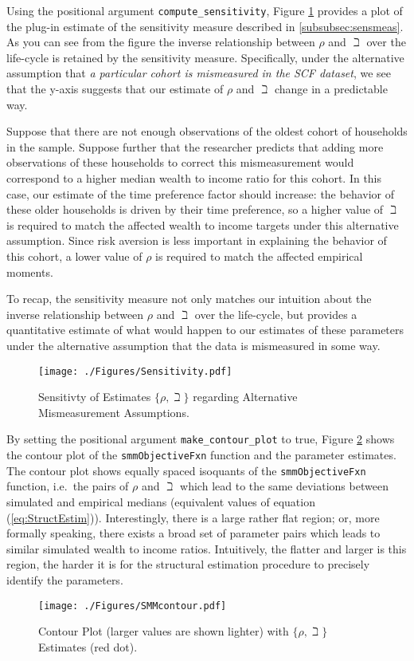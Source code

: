Using the positional argument \texttt{compute\_sensitivity}, Figure \ref{fig:PlotSensitivityMeasure} provides a plot of the plug-in estimate of the sensitivity measure described in \ref{subsubsec:sensmeas}. As you can see from the figure the inverse relationship between $\rho$ and $\beth$ over the life-cycle is retained by the sensitivity measure. Specifically, under the alternative assumption that \textit{a particular cohort is mismeasured in the SCF dataset}, we see that the y-axis suggests that our estimate of $\rho$ and $\beth$ change in a predictable way.

Suppose that there are not enough observations of the oldest cohort of households in the sample. Suppose further that the researcher predicts that adding more observations of these households to correct this mismeasurement would correspond to a higher median wealth to income ratio for this cohort. In this case, our estimate of the time preference factor should increase: the behavior of these older households is driven by their time preference, so a higher value of $\beth$ is required to match the affected wealth to income targets under this alternative assumption. Since risk aversion is less important in explaining the behavior of this cohort, a lower value of $\rho$ is required to match the affected empirical moments.

To recap, the sensitivity measure not only matches our intuition about the inverse relationship between $\rho$ and $\beth$ over the life-cycle, but provides a quantitative estimate of what would happen to our estimates of these parameters under the alternative assumption that the data is mismeasured in some way.

\hypertarget{PlotSensitivityMeasure}{}
\begin{figure}
  \texttt{[image: ./Figures/Sensitivity.pdf]}
  \caption{Sensitivty of Estimates $\{\rho,{\beth}\}$ regarding Alternative Mismeasurement Assumptions.}
  \label{fig:PlotSensitivityMeasure}
\end{figure}

By setting the positional argument \texttt{make\_contour\_plot} to true, Figure \ref{fig:PlotContourMedianStrEst} shows the contour plot of the \texttt{smmObjectiveFxn} function and the parameter estimates. The contour plot shows equally spaced isoquants of the \texttt{smmObjectiveFxn} function, i.e.\ the pairs of $\rho$ and ${\beth}$ which lead to the same deviations between simulated and empirical medians (equivalent values of equation (\ref{eq:StructEstim})). Interestingly, there is a large rather flat region; or, more formally speaking, there exists a broad set of parameter pairs which leads to similar simulated wealth to income ratios. Intuitively, the flatter and larger is this region, the harder it is for the structural estimation procedure to precisely identify the parameters.


\hypertarget{PlotContourMedianStrEst}{}
\begin{figure}
  \texttt{[image: ./Figures/SMMcontour.pdf]}
  \caption{Contour Plot (larger values are shown lighter) with $\{\rho,{\beth}\}$ Estimates (red dot).}
  \label{fig:PlotContourMedianStrEst}
\end{figure}

